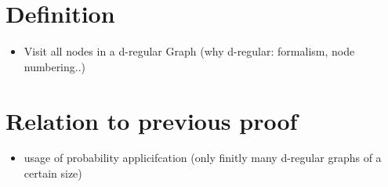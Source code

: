 \section{Definition}\label{definition}

\begin{itemize}
\itemsep1pt\parskip0pt
\item
  Visit all nodes in a d-regular Graph (why d-regular: formalism, node
  numbering..)
\end{itemize}

\section{Relation to previous proof}\label{relation-to-previous-proof}

\begin{itemize}
\itemsep1pt\parskip0pt
\item
  usage of probability applicifcation (only finitly many d-regular
  graphs of a certain size)
\end{itemize}



